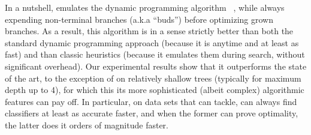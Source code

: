 \documentclass{llncs}
\begin{document}
In a nutshell, \budalg emulates the dynamic programming algorithm \dleight~\cite{dl8}, while always expending non-terminal branches (a.k.a ``buds'') before optimizing grown branches. As a result, this algorithm is in a sense strictly better than both the standard dynamic programming approach (because it is anytime and at least as fast) and than classic heuristics (because it emulates them during search, without significant overhead).
Our experimental results show that it outperforms the state of the art, to the exception of \murtree on relatively shallow trees (typically for maximum depth up to 4), for which this its more sophisticated (albeit complex) algorithmic features can pay off.
In particular, on data sets that \dleight can tackle, \budalg can always find classifiers at least as accurate faster, and when the former can prove optimality, the latter does it orders of magnitude faster.
\end{document}
